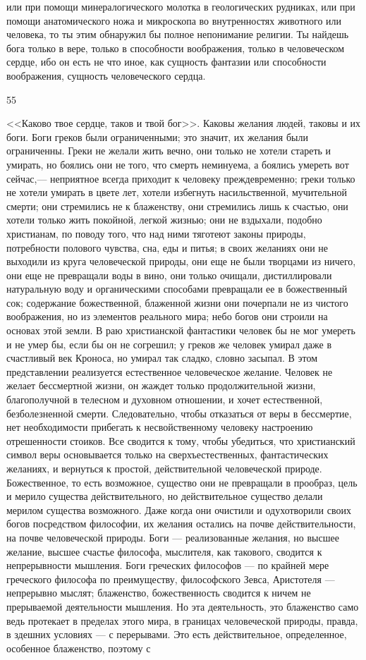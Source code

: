 \documentclass[12pt]{article}
\begin{document}
или при помощи минералогического молотка в геологических рудниках, или при помощи анатомического ножа и микроскопа во внутренностях животного или человека, то ты этим обнаружил бы полное непонимание религии. Ты найдешь бога только в вере, только в способности воображения, только в человеческом сердце, ибо он есть не что иное, как сущность фантазии или способности воображения, сущность человеческого сердца.



55

<<Каково твое сердце, таков и твой бог>>. Каковы желания людей, таковы и их боги. Боги греков были ограниченными; это значит, их желания были ограниченны. Греки не желали жить вечно, они только не хотели стареть и умирать, но боялись они не того, что смерть неминуема, а боялись умереть вот сейчас,--- неприятное всегда приходит к человеку преждевременно; греки только не хотели умирать в цвете лет, хотели избегнуть насильственной, мучительной смерти; они стремились не к блаженству, они стремились лишь к счастью, они хотели только жить покойной, легкой жизнью; они не вздыхали, подобно христианам, по поводу того, что над ними тяготеют законы природы, потребности полового чувства, сна, еды и питья; в своих желаниях они не выходили из круга человеческой природы, они еще не были творцами из ничего, они еще не превращали воды в вино, они только очищали, дистиллировали натуральную воду и органическими способами превращали ее в божественный сок; содержание божественной, блаженной жизни они почерпали не из чистого воображения, но из элементов реального мира; небо богов они строили на основах этой земли. В раю христианской фантастики человек бы не мог умереть и не умер бы, если бы он не согрешил; у греков же человек умирал даже в счастливый век Кроноса, но умирал так сладко, словно засыпал. В этом представлении реализуется естественное человеческое желание. Человек не желает бессмертной жизни, он жаждет только продолжительной жизни, благополучной в телесном и духовном отношении, и хочет естественной, безболезненной смерти. Следовательно, чтобы отказаться от веры в бессмертие, нет необходимости прибегать к несвойственному человеку настроению отрешенности стоиков. Все сводится к тому, чтобы убедиться, что христианский символ веры основывается только на сверхъестественных, фантастических желаниях, и вернуться к простой, действительной человеческой природе. Божественное, то есть возможное, существо они не превращали в прообраз, цель и мерило существа действительного, но действительное существо делали мерилом существа возможного. Даже когда они очистили и одухотворили своих богов посредством философии, их желания остались на почве действительности, на почве человеческой природы. Боги --- реализованные желания, но высшее желание, высшее счастье философа, мыслителя, как такового, сводится к непрерывности мышления. Боги греческих философов --- по крайней мере греческого философа по преимуществу, философского Зевса, Аристотеля --- непрерывно мыслят; блаженство, божественность сводится к ничем не прерываемой деятельности мышления. Но эта деятельность, это блаженство само ведь протекает в пределах этого мира, в границах человеческой природы, правда, в здешних условиях --- с перерывами. Это есть действительное, определенное, особенное блаженство, поэтому с 
\end{document}

